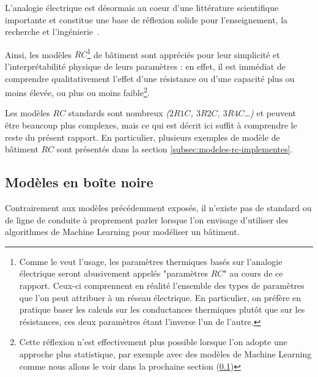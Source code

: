         \begin{bluebox}

            L'analogie électrique est désormais au coeur d'une littérature scientifique
            importante et constitue une base de réflexion solide pour l'enseignement, la
            recherche et l'ingénierie~\cite[chap.~VI]{manuel_energie_batiment}.

            Ainsi, les modèles $RC$\footnote{Comme le veut l'usage, les paramètres thermiques basés sur l'analogie électrique seront abusivement appelés "paramètres $RC$" au cours de ce rapport. Ceux-ci comprennent en réalité l'ensemble des types de paramètres que l'on peut attribuer à un réseau électrique. En particulier, on préfère en pratique baser les calculs sur les conductances thermiques plutôt que sur les résistances, ces deux paramètres étant l'inverse l'un de l'autre.} de bâtiment sont appréciés pour leur simplicité et
            l'interprétabilité physique de leurs paramètres : en effet, il est immédiat de
            comprendre qualitativement l'effet d'une résistance ou d'une capacité plus ou moins
            élevée, ou plus ou moins faible\footnote{Cette réflexion n'est effectivement plus possible lorsque l'on adopte une approche plus statistique, par exemple avec des modèles de Machine Learning comme nous allons le voir dans la prochaine section (\ref{subsec:machine-learning-pour-le-batiment})}.

            Les modèles $RC$ standards sont nombreux \textit{($2R1C$, $3R2C$, $3R4C$\ldots)} et
            peuvent être beaucoup plus complexes, mais ce qui est décrit ici suffit à comprendre
            le reste du présent rapport.
            En particulier, plusieurs exemples de modèle de bâtiment
            $RC$ sont présentés dans la section \ref{subsec:modeles-rc-implementes}.

        \end{bluebox}

    \subsection{Modèles en boîte noire}\label{subsec:machine-learning-pour-le-batiment}

        Contrairement aux modèles précédemment exposés, il n'existe pas de standard ou de ligne de
        conduite à proprement parler lorsque l'on envisage d'utiliser des algorithmes de Machine
        Learning pour modéliser un bâtiment\cite{ZHANG2021116452}.

